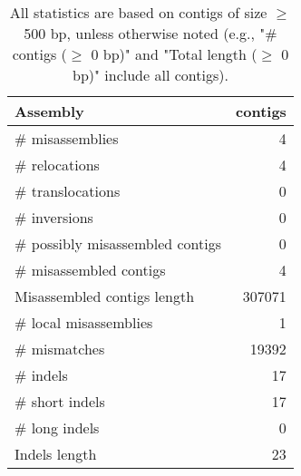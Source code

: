 \documentclass[12pt,a4paper]{article}
\begin{document}
\begin{table}[ht]
\begin{center}
\caption{All statistics are based on contigs of size $\geq$ 500 bp, unless otherwise noted (e.g., "\# contigs ($\geq$ 0 bp)" and "Total length ($\geq$ 0 bp)" include all contigs).}
\begin{tabular}{|l*{1}{|r}|}
\hline
Assembly & contigs \\ \hline
\# misassemblies & 4 \\ \hline
\hspace{5mm}\# relocations & 4 \\ \hline
\hspace{5mm}\# translocations & 0 \\ \hline
\hspace{5mm}\# inversions & 0 \\ \hline
\# possibly misassembled contigs & 0 \\ \hline
\# misassembled contigs & 4 \\ \hline
Misassembled contigs length & 307071 \\ \hline
\# local misassemblies & 1 \\ \hline
\# mismatches & 19392 \\ \hline
\# indels & 17 \\ \hline
\hspace{5mm}\# short indels & 17 \\ \hline
\hspace{5mm}\# long indels & 0 \\ \hline
Indels length & 23 \\ \hline
\end{tabular}
\end{center}
\end{table}
\end{document}
